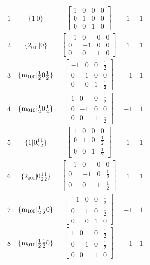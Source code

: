 \documentclass[fleqn,8pt]{jsarticle}
\begin{document}
\begin{longtable}{ccccc}
$ 1 $ & $ \{1|0\} $ & $ \begin{bmatrix} 1 & 0 & 0 & 0 \\ 0 & 1 & 0 & 0 \\ 0 & 0 & 1 & 0 \end{bmatrix} $ & $ 1 $ & $ 1 $ \\ \hline
$ 2 $ & $ \{2{}_{001}|0\} $ & $ \begin{bmatrix} -1 & 0 & 0 & 0 \\ 0 & -1 & 0 & 0 \\ 0 & 0 & 1 & 0 \end{bmatrix} $ & $ 1 $ & $ 1 $ \\ \hline
$ 3 $ & $ \{{\rm m}_{100}|\frac{1}{2} 0 \frac{1}{2}\} $ & $ \begin{bmatrix} -1 & 0 & 0 & \frac{1}{2} \\ 0 & 1 & 0 & 0 \\ 0 & 0 & 1 & \frac{1}{2} \end{bmatrix} $ & $ -1 $ & $ 1 $ \\ \hline
$ 4 $ & $ \{{\rm m}_{010}|\frac{1}{2} 0 \frac{1}{2}\} $ & $ \begin{bmatrix} 1 & 0 & 0 & \frac{1}{2} \\ 0 & -1 & 0 & 0 \\ 0 & 0 & 1 & \frac{1}{2} \end{bmatrix} $ & $ -1 $ & $ 1 $ \\ \hline
$ 5 $ & $ \{1|0 \frac{1}{2} \frac{1}{2}\} $ & $ \begin{bmatrix} 1 & 0 & 0 & 0 \\ 0 & 1 & 0 & \frac{1}{2} \\ 0 & 0 & 1 & \frac{1}{2} \end{bmatrix} $ & $ 1 $ & $ 1 $ \\ \hline
$ 6 $ & $ \{2{}_{001}|0 \frac{1}{2} \frac{1}{2}\} $ & $ \begin{bmatrix} -1 & 0 & 0 & 0 \\ 0 & -1 & 0 & \frac{1}{2} \\ 0 & 0 & 1 & \frac{1}{2} \end{bmatrix} $ & $ 1 $ & $ 1 $ \\ \hline
$ 7 $ & $ \{{\rm m}_{100}|\frac{1}{2} \frac{1}{2} 0\} $ & $ \begin{bmatrix} -1 & 0 & 0 & \frac{1}{2} \\ 0 & 1 & 0 & \frac{1}{2} \\ 0 & 0 & 1 & 0 \end{bmatrix} $ & $ -1 $ & $ 1 $ \\ \hline
$ 8 $ & $ \{{\rm m}_{010}|\frac{1}{2} \frac{1}{2} 0\} $ & $ \begin{bmatrix} 1 & 0 & 0 & \frac{1}{2} \\ 0 & -1 & 0 & \frac{1}{2} \\ 0 & 0 & 1 & 0 \end{bmatrix} $ & $ -1 $ & $ 1 $ \\
\end{longtable}
\end{document}
